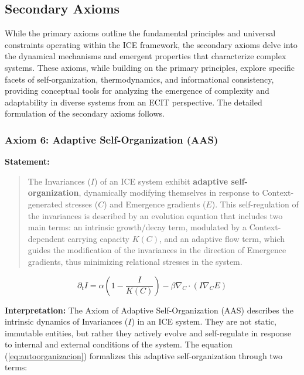\documentclass{article}
\begin{document}
\subsection{Secondary Axioms}
\label{subsec:axiomas-secundarios}
While the primary axioms outline the fundamental principles and universal constraints operating within the ICE framework, the secondary axioms delve into the dynamical mechanisms and emergent properties that characterize complex systems. These axioms, while building on the primary principles, explore specific facets of self-organization, thermodynamics, and informational consistency, providing conceptual tools for analyzing the emergence of complexity and adaptability in diverse systems from an ECIT perspective. The detailed formulation of the secondary axioms follows.

\subsubsection{Axiom 6: Adaptive Self-Organization (AAS)}
\label{ax:autoorganizacion}

\textbf{Statement:}
\begin{quote}
    The Invariances ($I$) of an ICE system exhibit \textbf{adaptive self-organization}, dynamically modifying themselves in response to Context-generated stresses ($C$) and Emergence gradients ($E$). This self-regulation of the invariances is described by an evolution equation that includes two main terms: an intrinsic growth/decay term, modulated by a Context-dependent carrying capacity $K(C)$, and an adaptive flow term, which guides the modification of the invariances in the direction of Emergence gradients, thus minimizing relational stresses in the system.
\end{quote}


\begin{equation}
\partial_t I = \alpha \left(1 - \frac{I}{K(C)}\right) - \beta \nabla_C \cdot (I \nabla_C E)
\label{eq:autoorganizacion}
\end{equation}
\bigskip

\textbf{Interpretation:} The Axiom of Adaptive Self-Organization (AAS) describes the intrinsic dynamics of Invariances ($I$) in an ICE system. They are not static, immutable entities, but rather they actively evolve and self-regulate in response to internal and external conditions of the system. The equation (\ref{eq:autoorganizacion}) formalizes this adaptive self-organization through two terms:
\end{document}
